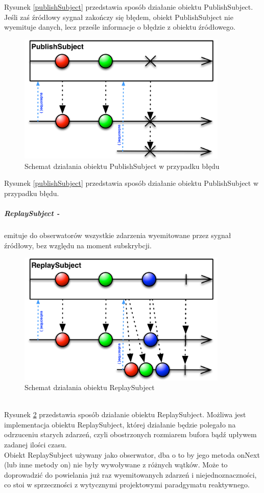 \documentclass[12pt,oneside,a4paper]{report}
\begin{document}
\\
\\
Rysunek \ref{publishSubject} przedstawia sposób działanie obiektu PublishSubject. 
Jeśli zaś źródłowy sygnał zakończy się błędem, obiekt PublishSubject nie wyemituje danych, lecz prześle informacje o błędzie z obiektu źródłowego.
\begin{figure}[ht!]
	\centering
	\includegraphics[width=10cm]{publishSubjectFailed}
	\caption{Schemat działania obiektu PublishSubject w przypadku błędu\cite{subjects}}
	\label{publishSubjectFailed}
\end{figure}
Rysunek \ref{publishSubject} przedstawia sposób działanie obiektu PublishSubject w przypadku błędu.
\subparagraph{ReplaySubject -}emituje do obserwatorów wszystkie zdarzenia wyemitowane przez sygnał źródłowy, bez względu na moment subskrybcji. 
\begin{figure}[ht!]
	\centering
	\includegraphics[width=10cm]{replaySubject}
	\caption{Schemat działania obiektu ReplaySubject\cite{subjects}}
	\label{replaySubject}
\end{figure}\\
Rysunek \ref{replaySubject} przedstawia sposób działanie obiektu ReplaySubject.
Możliwa jest implementacja obiektu ReplaySubject, której działanie będzie polegało na odrzuceniu starych zdarzeń, czyli obostrzonych rozmiarem bufora bądź upływem zadanej ilości czasu.\\
Obiekt ReplaySubject używany jako obserwator, dba o to by jego metoda onNext (lub inne metody on) nie były wywoływane z różnych wątków. Może to doprowadzić do powielania już raz wyemitowanych zdarzeń i niejednoznaczności, co stoi w sprzeczności z wytycznymi projektowymi paradgymatu reaktywnego.\cite{rxDesignGuideline} 
\end{document}
